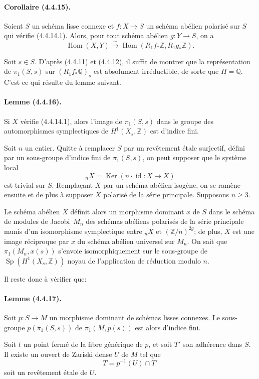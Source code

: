 \documentclass[10pt]{article}
\newcommand{\Q}{\mathbb Q}
\newcommand{\Z}{\mathbb Z}
\newcommand{\Ker}{\operatorname{Ker}}
\newcommand{\Hom}{\operatorname{Hom}}
\newcommand{\fg}{\guillemotright}
\newcommand{\og}{\guillemotleft}
\newcommand{\iso}{\xrightarrow{\sim}}
\providecommand{\Sp}{\operatorname{Sp}}
\begin{document}
\paragraph{Corollaire (4.4.15).} Soient $S$ un schéma lisse connexe et $f:X\to S$ un schéma abélien polarisé sur $S$ qui vérifie (4.4.14.1). Alors, pour tout schéma abélien $g:Y\to S$, on a
\[
\Hom(X,Y)\iso\Hom(R_1f_*\Z,R_1g_*\Z).
\]

Soit $s\in S$. D'après (4.4.11) et (4.4.12), il suffit de montrer que la représentation de $\pi_1(S,s)$ sur $(R_1f_*\Q)_s$ est absolument irréductible, de sorte que $H=\Q$. C'est ce qui résulte du lemme suivant.

\paragraph{Lemme (4.4.16).} Si $X$ vérifie (4.4.14.1), alors l'image de $\pi_1(S,s)$ dans le groupe des automorphismes symplectiques de $H^1(X_s,\Z)$ est d'indice fini.

Soit $n$ un entier. Quitte à remplacer $S$ par un revêtement étale surjectif, défini par un sous-groupe d'indice fini de $\pi_1(S,s)$, on peut supposer que le système local
\[
{}_nX=\Ker(n\cdot \operatorname{id}:X\to X)
\]
est trivial sur $S$. Remplaçant $X$ par un schéma abélien isogène, on se ramène ensuite et de plus à supposer $X$ polarisé de la série principale. Supposons $n\ge3$.

Le schéma abélien $X$ définit alors un morphisme dominant $x$ de $S$ dans le schéma de modules \og de Jacobi\fg\ $M_n$ des schémas abéliens polarisés de la série principale munis d'un isomorphisme symplectique entre ${}_nX$ et $(\Z/n)^{2g}$; de plus, $X$ est une image réciproque par $x$ du schéma abélien universel sur $M_n$. On sait que $\pi_1(M_n,x(s))$ s'envoie isomorphiquement sur le sous-groupe de $\Sp(H^1(X_s,\Z))$ noyau de l'application de réduction modulo $n$.

Il reste donc à vérifier que:

\paragraph{Lemme (4.4.17).} Soit $p:S\to M$ un morphisme dominant de schémas lisses connexes. Le sous-groupe $p(\pi_1(S,s))$ de $\pi_1(M,p(s))$ est alors d'indice fini.

Soit $t$ un point fermé de la fibre générique de $p$, et soit $T'$ son adhérence dans $S$. Il existe un ouvert de Zariski dense $U$ de $M$ tel que
\[
T=p^{-1}(U)\cap T'
\]
soit un revêtement étale de $U$.
\end{document}
